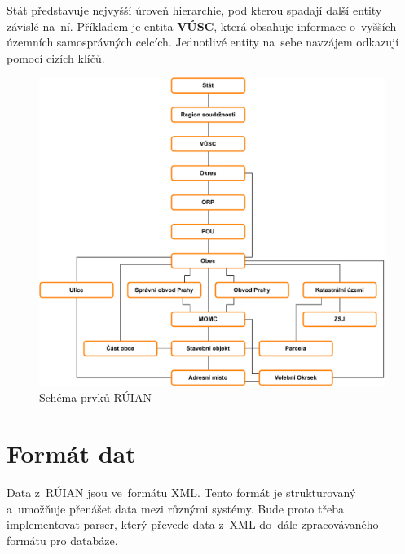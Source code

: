 Stát představuje nejvyšší úroveň hierarchie, pod kterou spadají další entity závislé na~ní.
Příkladem je entita \textbf{VÚSC}, která obsahuje informace o~vyšších územních samosprávných celcích.
Jednotlivé entity na~sebe navzájem odkazují pomocí cizích klíčů.

\begin{figure}[!h]
    \centering
    \includegraphics[width=\textwidth]{figures/ruian_diagram.pdf}
    \caption{Schéma prvků RÚIAN}
    \label{fig:ruian_tables}
\end{figure}

\newpage

\section{Formát dat}
Data z~RÚIAN jsou ve~formátu XML. Tento formát je strukturovaný a~umožňuje přenášet data mezi různými systémy.
Bude proto třeba implementovat parser, který převede data z~XML do~dále zpracovávaného formátu pro databáze.
